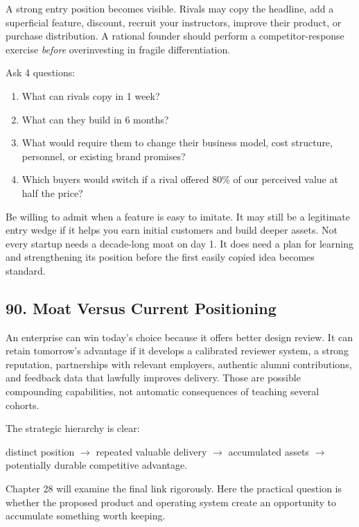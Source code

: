 A strong entry position becomes visible. Rivals may copy the headline, add a superficial feature, discount, recruit your instructors, improve their product, or purchase distribution. A rational founder should perform a competitor-response exercise \emph{before} overinvesting in fragile differentiation.

Ask 4 questions:
\begin{enumerate}
    \item What can rivals copy in 1 week?
    \item What can they build in 6 months?
    \item What would require them to change their business model, cost structure, personnel, or existing brand promises?
    \item Which buyers would switch if a rival offered 80\% of our perceived value at half the price?
\end{enumerate}

Be willing to admit when a feature is easy to imitate. It may still be a legitimate entry wedge if it helps you earn initial customers and build deeper assets. Not every startup needs a decade-long moat on day 1. It does need a plan for learning and strengthening its position before the first easily copied idea becomes standard.

\subsection*{90. Moat Versus Current Positioning}

An enterprise can win today's choice because it offers better design review. It can retain tomorrow's advantage if it develops a calibrated reviewer system, a strong reputation, partnerships with relevant employers, authentic alumni contributions, and feedback data that lawfully improves delivery. Those are possible compounding capabilities, not automatic consequences of teaching several cohorts.

The strategic hierarchy is clear:
\begin{center}
distinct position $\rightarrow$ repeated valuable delivery $\rightarrow$ accumulated assets $\rightarrow$ potentially durable competitive advantage.
\end{center}

Chapter 28 will examine the final link rigorously. Here the practical question is whether the proposed product and operating system create an opportunity to accumulate something worth keeping.

